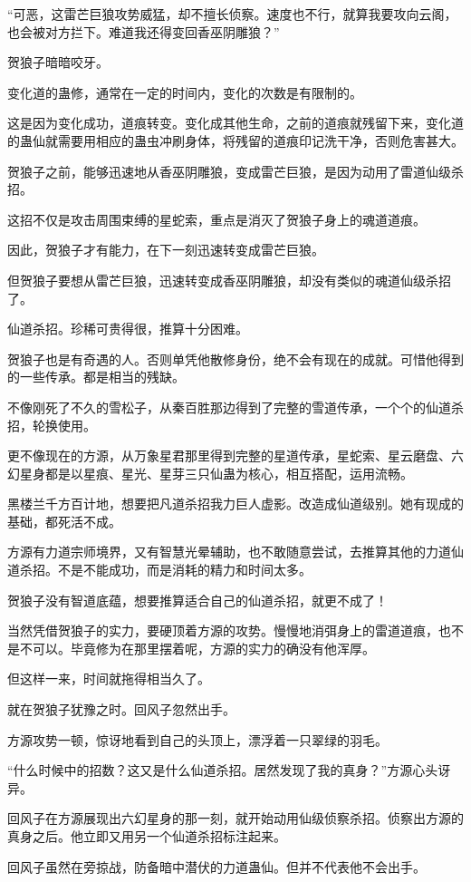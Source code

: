 \begin{this_body}
“可恶，这雷芒巨狼攻势威猛，却不擅长侦察。速度也不行，就算我要攻向云阁，也会被对方拦下。难道我还得变回香巫阴雕狼？”

贺狼子暗暗咬牙。

变化道的蛊修，通常在一定的时间内，变化的次数是有限制的。

这是因为变化成功，道痕转变。变化成其他生命，之前的道痕就残留下来，变化道的蛊仙就需要用相应的蛊虫冲刷身体，将残留的道痕印记洗干净，否则危害甚大。

贺狼子之前，能够迅速地从香巫阴雕狼，变成雷芒巨狼，是因为动用了雷道仙级杀招。

这招不仅是攻击周围束缚的星蛇索，重点是消灭了贺狼子身上的魂道道痕。

因此，贺狼子才有能力，在下一刻迅速转变成雷芒巨狼。

但贺狼子要想从雷芒巨狼，迅速转变成香巫阴雕狼，却没有类似的魂道仙级杀招了。

仙道杀招。珍稀可贵得很，推算十分困难。

贺狼子也是有奇遇的人。否则单凭他散修身份，绝不会有现在的成就。可惜他得到的一些传承。都是相当的残缺。

不像刚死了不久的雪松子，从秦百胜那边得到了完整的雪道传承，一个个的仙道杀招，轮换使用。

更不像现在的方源，从万象星君那里得到完整的星道传承，星蛇索、星云磨盘、六幻星身都是以星痕、星光、星芽三只仙蛊为核心，相互搭配，运用流畅。

黑楼兰千方百计地，想要把凡道杀招我力巨人虚影。改造成仙道级别。她有现成的基础，都死活不成。

方源有力道宗师境界，又有智慧光晕辅助，也不敢随意尝试，去推算其他的力道仙道杀招。不是不能成功，而是消耗的精力和时间太多。

贺狼子没有智道底蕴，想要推算适合自己的仙道杀招，就更不成了！

当然凭借贺狼子的实力，要硬顶着方源的攻势。慢慢地消弭身上的雷道道痕，也不是不可以。毕竟修为在那里摆着呢，方源的实力的确没有他浑厚。

但这样一来，时间就拖得相当久了。

就在贺狼子犹豫之时。回风子忽然出手。

方源攻势一顿，惊讶地看到自己的头顶上，漂浮着一只翠绿的羽毛。

“什么时候中的招数？这又是什么仙道杀招。居然发现了我的真身？”方源心头讶异。

回风子在方源展现出六幻星身的那一刻，就开始动用仙级侦察杀招。侦察出方源的真身之后。他立即又用另一个仙道杀招标注起来。

回风子虽然在旁掠战，防备暗中潜伏的力道蛊仙。但并不代表他不会出手。


\end{this_body}

